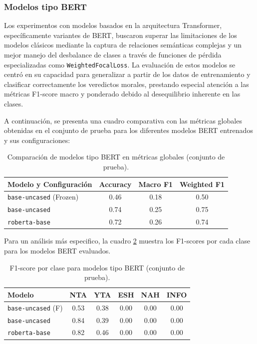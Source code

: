 \subsubsection{Modelos tipo BERT}

Los experimentos con modelos basados en la arquitectura Transformer, específicamente variantes de BERT, buscaron superar las limitaciones de los modelos clásicos mediante la captura de relaciones semánticas complejas y un mejor manejo del desbalance de clases a través de funciones de pérdida especializadas como \texttt{WeightedFocalLoss}. La evaluación de estos modelos se centró en su capacidad para generalizar a partir de los datos de entrenamiento y clasificar correctamente los veredictos morales, prestando especial atención a las métricas F1-score macro y ponderado debido al desequilibrio inherente en las clases.

A continuación, se presenta una cuadro comparativa con las métricas globales obtenidas en el conjunto de prueba para los diferentes modelos BERT entrenados y sus configuraciones:

\begin{table}[H]
\centering
\caption{Comparación de modelos tipo BERT en métricas globales (conjunto de prueba).}
\label{tab:bert_results}
\begin{tabular}{@{}lccc@{}}
\toprule
\textbf{Modelo y Configuración} & \textbf{Accuracy} & \textbf{Macro F1} & \textbf{Weighted F1} \\
\midrule
\texttt{base-uncased} (Frozen) & 0.46 & 0.18 & 0.50 \\
\texttt{base-uncased} & 0.74 & 0.25 & 0.75 \\
\texttt{roberta-base}  & 0.72 & 0.26 & 0.74 \\

\bottomrule
\end{tabular}
\end{table}


Para un análisis más especifico, la cuadro \ref{tab:bert_f1_per_class} muestra los F1-scores por cada clase para los modelos BERT evaluados.

\begin{table}[H]
\centering
\caption{F1-score por clase para modelos tipo BERT (conjunto de prueba).}
\label{tab:bert_f1_per_class}
\begin{tabular}{@{}lccccc@{}}
\toprule
\textbf{Modelo} & \textbf{NTA} & \textbf{YTA} & \textbf{ESH} & \textbf{NAH} & \textbf{INFO} \\
\midrule
\texttt{base-uncased} (F) & 0.53 & 0.38 & 0.00 & 0.00 & 0.00 \\
\texttt{base-uncased} & 0.84 & 0.39 & 0.00 & 0.00 & 0.00 \\
\texttt{roberta-base}  & 0.82 & 0.46 & 0.00 & 0.00 & 0.00 \\

\bottomrule
\end{tabular}
\end{table}

